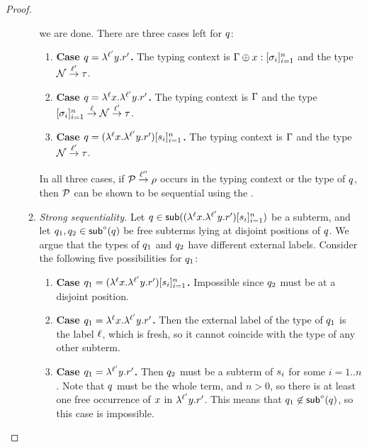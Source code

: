 \begin{proof}
\begin{enumerate}
\begin{enumerate}
    we are done.
    There are three cases left for $q$:
    \begin{enumerate}
    \item {\bf Case $q = \lambda^{\ell'} y. r'$.}
      The typing context is $\Gamma \oplus x : [\sigma_i]_{i=1}^n$ and the type $\mathcal{N} \overset{\ell'}{\to} \tau$.
    \item {\bf Case $q = \lambda^{\ell} x. \lambda^{\ell'} y. r'$.}
      The typing context is $\Gamma$ and the type $[\sigma_i]_{i=1}^n \overset{\ell}{\to} \mathcal{N} \overset{\ell'}{\to} \tau$.
    \item {\bf Case $q = (\lambda^{\ell} x. \lambda^{\ell'} y. r')[s_i]_{i=1}^{n}$.}
      The typing context is $\Gamma$ and the type $\mathcal{N} \overset{\ell'}{\to} \tau$.
    \end{enumerate}
    In all three cases, if $\mathcal{P} \overset{\ell''}{\to} \rho$ occurs in the typing context
    or the type of $q$, then $\mathcal{P}$ can be shown to be sequential using the \ih.
  \item {\em Strong sequentiality.}
    \label{refinement_substitution_inverse__case_lambda_strong_sequentiality}
    Let $q \in \mathsf{sub}((\lambda^{\ell} x. \lambda^{\ell'} y. r')[s_i]_{i=1}^{n})$
    be a subterm,
    and let $q_1,q_2 \in \mathsf{sub}^{\circ}(q)$ be free subterms lying at disjoint positions of $q$.
    We argue that the types of $q_1$ and $q_2$ have different external labels.
    Consider the following five possibilities for $q_1$:
    \begin{enumerate}
    \item {\bf Case $q_1 = (\lambda^{\ell} x. \lambda^{\ell'} y. r')[s_i]_{i=1}^{n}$.}
      Impossible since $q_2$ must be at a disjoint position.
    \item {\bf Case $q_1 = \lambda^{\ell} x. \lambda^{\ell'} y. r'$.}
      Then the external label of the type of $q_1$ is the label $\ell$, which is fresh,
      so it cannot coincide with the type of any other subterm.
    \item {\bf Case $q_1 = \lambda^{\ell'} y. r'$.}
      Then $q_2$ must be a subterm of $s_i$ for some $i=1..n$.
      Note that $q$ must be the whole term,
      and $n > 0$, so there is at least one free occurrence of $x$ in $\lambda^{\ell'} y. r'$.
      This means that $q_1 \not\in \mathsf{sub}^{\circ}(q)$, so this case is impossible.

\end{enumerate}
\end{enumerate}
\end{enumerate}
\end{proof}
